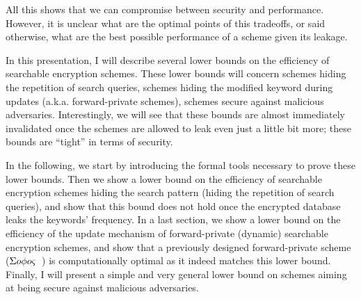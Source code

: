 All this shows that we can compromise between security and performance. 
However, it is unclear what are the optimal points of this tradeoffs, or said otherwise, what are the best possible performance of a scheme given its leakage.

\medskip

In this presentation, I will describe several lower bounds on the efficiency of searchable encryption schemes.
These lower bounds will concern schemes hiding the repetition of search queries, schemes hiding the modified keyword during updates (a.k.a. forward-private schemes), schemes secure against malicious adversaries.
Interestingly, we will see that these bounds are almost immediately invalidated once the schemes are allowed to leak even just a little bit more; these bounds are ``tight'' in terms of security. 

In the following, we start by introducing the formal tools necessary to prove these lower bounds.
Then we show a lower bound on the efficiency of searchable encryption schemes hiding the search pattern (hiding the repetition of search queries), and show that this bound does not hold once the encrypted database leaks the keywords' frequency.
In a last section, we show a lower bound on the efficiency of the update mechanism of forward-private (dynamic) searchable encryption schemes, and show that a previously designed forward-private scheme (${\Sigma o\phi o\varsigma}$~\cite{CCS:Bost16}) is computationally optimal as it indeed matches this lower bound.
Finally, I will present a simple and very general lower bound on schemes aiming at being secure against malicious adversaries.



